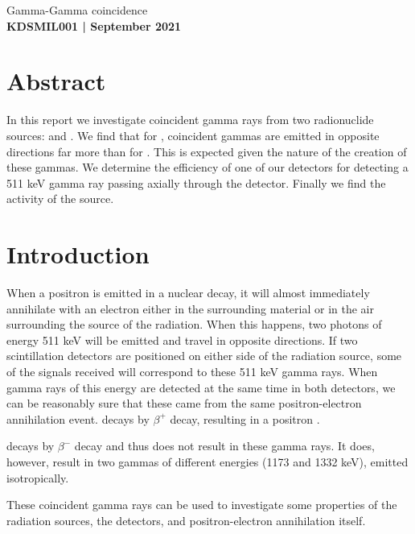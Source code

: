 \documentclass[11pt]{article}
\numberwithin{equation}{section}
\numberwithin{figure}{section}
\numberwithin{table}{section}
\begin{document}
\begin{center}
    {\huge Gamma-Gamma coincidence}\\
    \vspace{0.2in}
    \textbf{KDSMIL001 | September 2021}
    
    \section*{Abstract}\label{sec:Abstract}
    In this report we investigate coincident gamma rays from two radionuclide sources:  and . We find that for , coincident gammas are emitted in opposite directions far more than for . This is expected given the nature of the creation of these gammas. We determine the efficiency of one of our detectors for detecting a 511 keV gamma ray passing axially through the detector. Finally we find the activity of the  source.
    
\end{center}

\section{Introduction}\label{sec:Introduction}
\par When a positron is emitted in a nuclear decay, it will almost immediately annihilate with an electron either in the surrounding material or in the air surrounding the source of the radiation. When this happens, two photons of energy 511 keV will be emitted and travel in opposite directions. If two scintillation detectors are positioned on either side of the radiation source, some of the signals received will correspond to these 511 keV gamma rays. When gamma rays of this energy are detected at the same time in both detectors, we can be reasonably sure that these came from the same positron-electron annihilation event.  decays by $\beta^+$ decay, resulting in a positron \cite{22NaDecay}. 
\par {} decays by $\beta^-$ decay and thus does not result in these gamma rays. It does, however, result in two gammas of different energies (1173 and 1332 keV), emitted isotropically. 
\par These coincident gamma rays can be used to investigate some properties of the radiation sources, the detectors, and positron-electron annihilation itself. 
\end{document}
